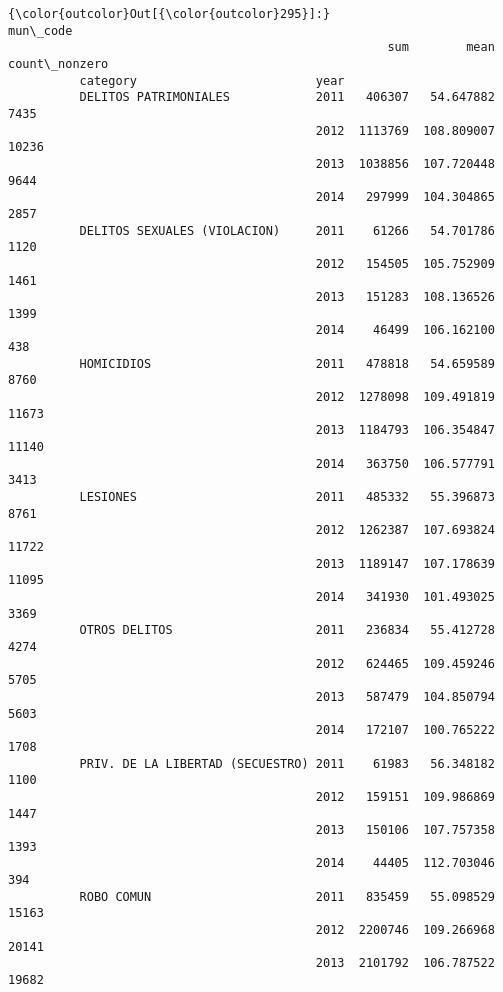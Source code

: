 \documentclass[11pt]{article}
\begin{document}
\begin{Verbatim}[commandchars=\\\{\}]
{\color{outcolor}Out[{\color{outcolor}295}]:}                                       mun\_code                          
                                                     sum        mean count\_nonzero
          category                         year                                   
          DELITOS PATRIMONIALES            2011   406307   54.647882          7435
                                           2012  1113769  108.809007         10236
                                           2013  1038856  107.720448          9644
                                           2014   297999  104.304865          2857
          DELITOS SEXUALES (VIOLACION)     2011    61266   54.701786          1120
                                           2012   154505  105.752909          1461
                                           2013   151283  108.136526          1399
                                           2014    46499  106.162100           438
          HOMICIDIOS                       2011   478818   54.659589          8760
                                           2012  1278098  109.491819         11673
                                           2013  1184793  106.354847         11140
                                           2014   363750  106.577791          3413
          LESIONES                         2011   485332   55.396873          8761
                                           2012  1262387  107.693824         11722
                                           2013  1189147  107.178639         11095
                                           2014   341930  101.493025          3369
          OTROS DELITOS                    2011   236834   55.412728          4274
                                           2012   624465  109.459246          5705
                                           2013   587479  104.850794          5603
                                           2014   172107  100.765222          1708
          PRIV. DE LA LIBERTAD (SECUESTRO) 2011    61983   56.348182          1100
                                           2012   159151  109.986869          1447
                                           2013   150106  107.757358          1393
                                           2014    44405  112.703046           394
          ROBO COMUN                       2011   835459   55.098529         15163
                                           2012  2200746  109.266968         20141
                                           2013  2101792  106.787522         19682

\end{Verbatim}
\end{document}
